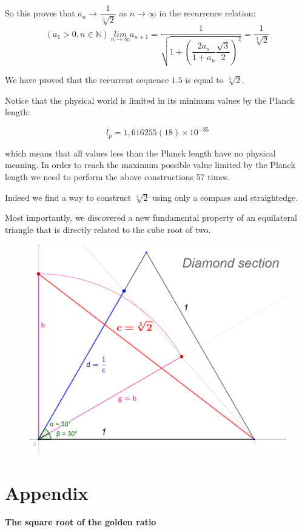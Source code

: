 \documentclass[12pt, letterpaper, oneside]{report}
\begin{document}
\vspace{10mm}
So this proves that $a_{n} \to \dfrac{1}{\sqrt[3]{2}}$ as $n\to \infty$  in the recurrence relation:
\[
( a_{1} > 0,  n \in \mathbb N ) \ \underset{n\to \infty }{lim} a_{n+1} = \dfrac{ 1 }{ \sqrt{ 1 + \left( \dfrac{ 2 a_{ n } }{ 1 + a_{ n } } \dfrac{ \sqrt{ 3 } }{ 2 } \right)^{2} } } =\dfrac{ 1 }{ \sqrt[3]{ 2 } }
\]
 \newpage
 \par
We have proved that the recurrent sequence $1.5$ is equal to $\sqrt[3] {2}$.
\newline
\par
Notice that the physical world is limited in its minimum values by the Planck length:

\[ l_{p} = 1,616255(18) \times 10^{-35} \]

which means that all values less than the Planck length have no physical meaning. In order to reach the maximum possible value limited by the Planck length we need to perform the above constructions 57 times.
\\
\par
Indeed we find a way to construct $\sqrt[3]{2}$ using only a compass and straightedge. 
\\
\par 
Most importantly, we discovered a new fundamental property of an equilateral triangle that is directly related to the cube root of two.
\\

\begin{figure}[h]
	\centering
	\includegraphics[width=0.7\linewidth]{images/ds_def.jpg}
	
	\label{fig:Diamond Section}
\end{figure}

\newpage

\section{Appendix}
\textbf{\large The square root of the golden ratio}
\end{document}
